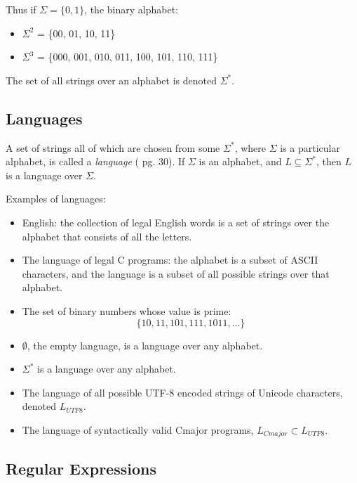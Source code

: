 \documentclass[a4paper,oneside,11pt]{book}
\theoremstyle{definition}
\begin{document}
Thus if $\Sigma = \{0, 1\}$, the binary alphabet:
\begin{itemize}
\item
$\Sigma^2$ = \{00, 01, 10, 11\}

\item
$\Sigma^3$ = \{000, 001, 010, 011, 100, 101, 110, 111\}
\end{itemize}

The set of all strings over an alphabet is denoted $\Sigma^*$.

\subsection{Languages}

A set of strings all of which are chosen from some $\Sigma^*$, where $\Sigma$ is a particular alphabet,
is called a \emph{language} (\cite{AUTOMATA} pg. 30).
If $\Sigma$ is an alphabet, and $L \subseteq \Sigma^*$, then $L$ is a language over $\Sigma$.

Examples of languages:
\begin{itemize}
\item
English: the collection of legal English words is a set of strings over the alphabet that consists of all
the letters.

\item
The language of legal C programs:
the alphabet is a subset of ASCII characters, and the language is a subset of all possible strings over
that alphabet.

\item
The set of binary numbers whose value is prime:
$$\{10, 11, 101, 111, 1011, \ldots\}$$

\item
$\emptyset$, the empty language, is a language over any alphabet.

\item
$\Sigma^*$ is a language over any alphabet.

\item
The language of all possible UTF-8 encoded strings of Unicode characters, denoted $L_{UTF8}$.

\item
The language of syntactically valid Cmajor programs, $L_{Cmajor} \subset L_{UTF8}$.
\end{itemize}

\subsection{Regular Expressions}
\end{document}
